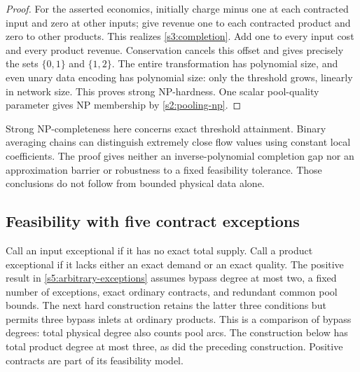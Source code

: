 \begin{proof}
For the asserted economics, initially charge minus one at each contracted
input and zero at other inputs; give revenue one to each contracted
product and zero to other products. This realizes \eqref{s3:completion}.
Add one to every input cost and every product revenue. Conservation
cancels this offset and gives precisely the sets $\{0,1\}$ and
$\{1,2\}$. The entire transformation has polynomial size, and even
unary data encoding has polynomial size: only the threshold grows,
linearly in network size. This proves strong NP-hardness. One scalar
pool-quality parameter gives NP membership by \cref{s2:pooling-np}.
\end{proof}

Strong NP-completeness here concerns exact threshold attainment. Binary
averaging chains can distinguish extremely close flow values using
constant local coefficients. The proof gives neither an inverse-polynomial
completion gap nor an approximation barrier or robustness to a fixed
feasibility tolerance. Those conclusions do not follow from bounded
physical data alone.

\subsection{Feasibility with five contract exceptions}\label{s3:five}

Call an input exceptional if it has no exact total supply. Call a product
exceptional if it lacks either an exact demand or an exact quality.
The positive result in \cref{s5:arbitrary-exceptions} assumes bypass
degree at most two, a fixed number of exceptions, exact ordinary
contracts, and redundant common pool bounds. The next hard construction
retains the latter three conditions but permits three bypass inlets at
ordinary products. This is a comparison of bypass degrees: total physical
degree also counts pool arcs. The construction below has total product
degree at most three, as did the preceding construction. Positive
contracts are part of its feasibility model.

